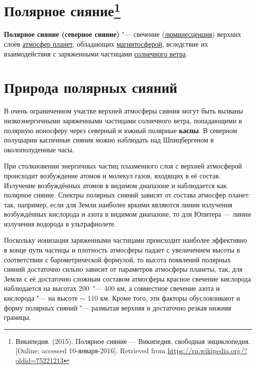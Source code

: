 \documentclass[a4paper,14pt]{article}
\theoremstyle{plain} %
\theoremstyle{definition} %
\theoremstyle{remark} %
\begin{document}
\section*{Полярное сияние\footnote{Википедия. (2015). Полярное сияние — Википедия, свободная энциклопедия. [Online; accessed 10-января-2016]. Retrieved from \url{https://ru.wikipedia.org/?oldid=75221213}}}

\textbf{Полярное сияние (северное сияние)} "--- свечение (\href{https://ru.wikipedia.org/wiki/%D0%9B%D1%8E%D0%BC%D0%B8%D0%BD%D0%B5%D1%81%D1%86%D0%B5%D0%BD%D1%86%D0%B8%D1%8F}{люминесценция})
верхних слоёв \href{https://ru.wikipedia.org/wiki/%D0%9F%D0%BB%D0%B0%D0%BD%D0%B5%D1%82%D0%B0}{атмосфер планет}, обладающих \href{https://ru.wikipedia.org/wiki/%D0%9C%D0%B0%D0%B3%D0%BD%D0%B8%D1%82%D0%BE%D1%81%D1%84%D0%B5%D1%80%D0%B0}{магнитосферой}, вследствие
их взаимодействия с заряженными частицами \href{https://ru.wikipedia.org/wiki/%D0%A1%D0%BE%D0%BB%D0%BD%D0%B5%D1%87%D0%BD%D1%8B%D0%B9_%D0%B2%D0%B5%D1%82%D0%B5%D1%80}{солнечного ветра}.


\tableofcontents


\section{Природа полярных сияний}

В очень ограниченном участке верхней атмосферы сияния могут быть
вызваны низкоэнергичными заряженными частицами солнечного ветра,
попадающими в полярную ионосферу через северный и южный полярные \textbf{каспы}. В северном полушарии каспенные сияния можно наблюдать
над Шпицбергеном в околополуденные часы.

При столкновении энергичных частиц плазменного слоя с верхней
атмосферой происходит возбуждение атомов и молекул газов, входящих
в её состав. Излучение возбуждённых атомов в видимом диапазоне и
наблюдается как полярное сияние. Спектры полярных сияний зависят
от состава атмосфер планет: так, например, если для Земли наиболее
яркими являются линии излучения возбуждённых кислорода и азота в
видимом диапазоне, то для Юпитера — линии излучения водорода в
ультрафиолете.

Поскольку ионизация заряженными частицами происходит наиболее
эффективно в конце пути частицы и плотность атмосферы падает с увеличением высоты в соответствии с барометрической формулой, то высота
появлений полярных сияний достаточно сильно зависит от параметров
атмосферы планеты, так, для Земли с её достаточно сложным составом
атмосферы красное свечение кислорода наблюдается на высотах 200~"---
400 км, а совместное свечение азота и кислорода "--- на высоте $\sim$ 110 км.
Кроме того, эти факторы обусловливают и форму полярных сияний "---
размытая верхняя и достаточно резкая нижняя границы.
\end{document}
